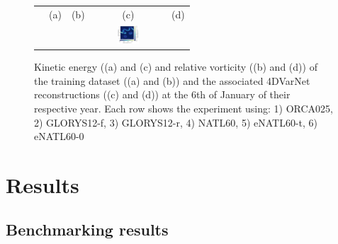 \documentclass[draft]{agujournal2019}
\begin{document}
\begin{figure}[H]
\begin{center}
\begin{tabular}{ccccc}
 \hspace{-15mm} &(a) & (b) & (c) & (d) \\
 &&
&\hspace{-30mm} \includegraphics[trim={8mm 0 22mm 7cm},clip,width=2.5cm,height=0.7cm]{figures/plots/horizontal_cbar_ke_bottom.png} &\\

\end{tabular}
\vspace{-3mm}
\caption{
Kinetic energy ((a) and (c) and relative vorticity ((b) and (d)) of the training dataset ((a) and (b)) and the associated 4DVarNet reconstructions ((c) and (d)) at the 6th of January of their respective year.
Each row shows the experiment using: 1) ORCA025, 2) GLORYS12-f, 3) GLORYS12-r, 4) NATL60, 5) eNATL60-t, 6) eNATL60-0}
\vspace{-5mm}
\label{fig:maps}
\end{center}
\end{figure}

\section{Results}
\label{sec:results}





\subsection{Benchmarking results}
\label{ssec:benchmarks}
\end{document}
